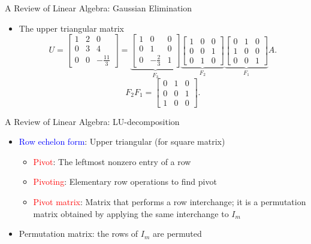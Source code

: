 \documentclass[aspectratio=169,hyperref,UTF8,CJK]{beamer}
\begin{document}
\begin{frame}{A Review of Linear Algebra: Gaussian Elimination}
  \footnotesize
  \begin{itemize}
    \item The upper triangular matrix
      \begin{equation*}
        U=\begin{bmatrix}1&2&0\\0&3&4\\0&0&-\frac{11}{3}\end{bmatrix}
        =\underbrace{\begin{bmatrix}1&0&0\\0&1&0\\0&-\frac23&1\end{bmatrix}}_{F_3}
         \underbrace{\begin{bmatrix}1&0&0\\0&0&1\\0&1&0\end{bmatrix}}_{F_2}
         \underbrace{\begin{bmatrix}0&1&0\\1&0&0\\0&0&1\end{bmatrix}}_{F_1}A.
      \end{equation*}
      \begin{equation*}
        F_2F_1=\begin{bmatrix}0&1&0\\0&0&1\\1&0&0\end{bmatrix}.
      \end{equation*}
  \end{itemize}
\end{frame}

\begin{frame}{A Review of Linear Algebra: LU-decomposition}
  \begin{itemize}
    \item \textcolor{blue}{Row echelon form}: Upper triangular (for square matrix)
      \begin{itemize}
        \item \textcolor{red}{Pivot}: The leftmost nonzero entry of a row
        \item \textcolor{red}{Pivoting}: Elementary row operations to find pivot
        \item \textcolor{red}{Pivot matrix}: Matrix that performs a row interchange; it is a permutation matrix obtained by applying the same interchange to $I_m$
      \end{itemize}
    \item Permutation matrix: the rows of $I_m$ are permuted
  \end{itemize}
\end{frame}
\end{document}
